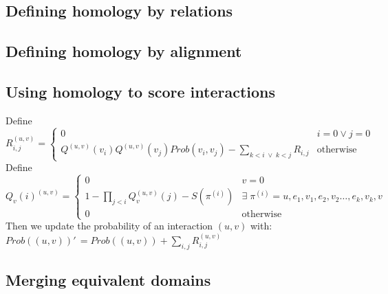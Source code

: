 \documentclass[11pt]{article}
\begin{document}
\subsection*{Defining homology by relations}

\subsection*{Defining homology by alignment}

\subsection*{Using homology to score interactions}

Define
\(
R_{i,j}^{(u,v)} = 
\left\{ \begin{array}{ll}
0 & i=0 \vee j=0\\
Q^{(u,v)}(v_i)Q^{(u,v)}(v_j)Prob(v_i,v_j) - \displaystyle \sum_{k < i \; \vee \; k < j} R_{i,j} & \text{otherwise}
\end{array} \right.
\)\\
Define
\(
Q_v(i)^{(u,v)} = 
\left\{ \begin{array}{ll}
0 & v=0\\
1 - \displaystyle \prod_{j < i} Q_v^{(u,v)}(j) - S(\pi^{(i)}) & \exists \; \pi^{(i)}=u,e_1,v_1,e_2,v_2 \ldots, e_k,v_k, v\\
0 & \text{otherwise}
\end{array} \right.
\)\\
Then we update the probability of an interaction $(u,v)$ with:\\
$Prob((u,v))'\,\! = Prob((u,v)) + \displaystyle \sum_{i,j} R_{i,j}^{(u,v)}$

\subsection*{Merging equivalent domains}
\end{document}
